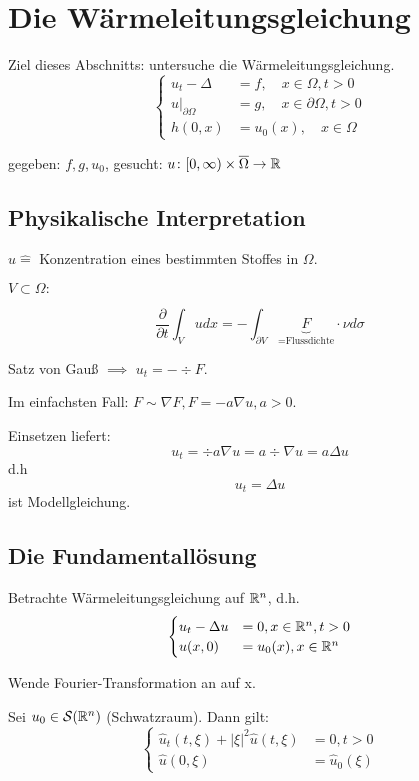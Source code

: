 \section{Die Wärmeleitungsgleichung}

Ziel dieses Abschnitts: untersuche die Wärmeleitungsgleichung.
$$
\begin{cases}
  u_t - \Delta &= f, \quad x \in \Omega, t > 0 \\
  u|_{\partial\Omega} &= g, \quad x \in \partial \Omega, t > 0 \\
  h(0,x) &= u_0(x), \quad x \in \Omega
\end{cases}
$$

gegeben: $f, g, u_0$, gesucht: $u \colon [0, \infty) \times \overline \Omega \to \mathbb{R}$

\subsection{Physikalische Interpretation}

$u \hat = $ Konzentration eines bestimmten Stoffes in $\Omega$.

$V \subset \Omega:$

$$
\frac{\partial}{\partial t} \int_V u dx = -\int_{\partial V} \underbrace{F}_{= \text{Flussdichte}} \cdot \nu d\sigma
$$

Satz von Gauß $\implies$ $u_t = -\div F$.

Im einfachsten Fall: $F \sim \nabla F, F = -a\nabla u, a > 0$.

Einsetzen liefert: 
$$
u_t = \div a \nabla u = a \div \nabla u = a \Delta u
$$
d.h
$$
u_t = \Delta u
$$
ist Modellgleichung.
  
\subsection{Die Fundamentallösung}

Betrachte Wärmeleitungsgleichung auf $\mathbb{R}^n$, d.h.
$$
\begin{cases}
  u_t - \Delta u &= 0, x \in \mathbb{R}^n, t > 0 \\
  u(x,0) &= u_0(x), x \in \mathbb{R}^n
\end{cases}
$$

Wende Fourier-Transformation an auf x.

Sei $u_0 \in \mathcal{S}(\mathbb{R}^n)$ (Schwatzraum). Dann gilt:
$$
\begin{cases}
  \hat u_t(t, \xi) + |\xi|^2 \hat u (t, \xi) &= 0, t > 0 \\
  \hat u(0,\xi) &= \hat u_0 (\xi)
\end{cases}
$$

